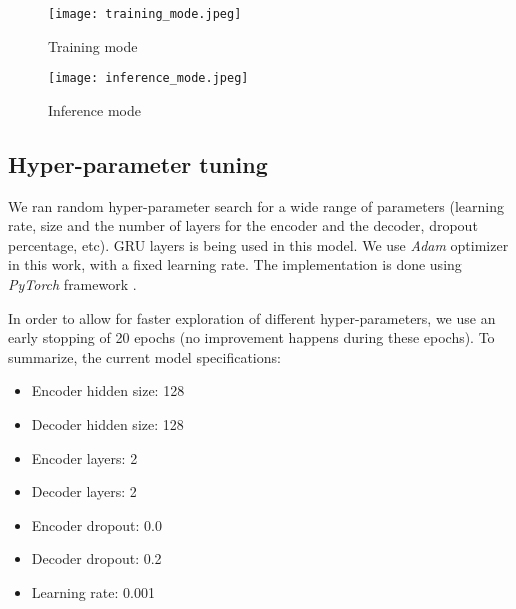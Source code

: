 \documentclass[conference]{IEEEtran}
\begin{document}

\begin{figure*}[htbp!]
    \centering
    \begin{subfigure}{1.0\textwidth}
        \centering
        \texttt{[image: training\_mode.jpeg]}
        \caption{Training mode\label{fig:training_mode}}
    \end{subfigure}
    \begin{subfigure}{1.0\textwidth}
        \centering
        \texttt{[image: inference\_mode.jpeg]}
        \caption{Inference mode\label{fig:inf_mode}}
    \end{subfigure}
    \caption{Schematic diagram of the model we used. During the training time \ref{fig:training_mode}, the input to the model is always the ground truth. During the inference time \ref{fig:inf_mode} however, the input to the decoder (generator) part at each time step is its own predication in the previous time step.}
    \label{fig:model_arch}
\end{figure*}

\subsection{Hyper-parameter tuning} \label{hyperparam}
\par We ran random hyper-parameter search for a wide range of parameters (learning rate, size and the number of layers for the encoder and the decoder, dropout percentage, etc). GRU layers \cite{cho2014learning,chung2014empirical} is being used in this model. We use \textit{Adam} \cite{kingma2014adam} optimizer in this work, with a fixed learning rate. The implementation is done using \textit{PyTorch} framework \cite{paszke2017automatic}.

\par In order to allow for faster exploration of different hyper-parameters, we use an early stopping of 20 epochs (no improvement happens during these epochs). To summarize, the current model specifications:
\begin{itemize}
    \item Encoder hidden size: 128
    \item Decoder hidden size: 128
    \item Encoder layers: 2
    \item Decoder layers: 2
    \item Encoder dropout: 0.0
    \item Decoder dropout: 0.2
    \item Learning rate: 0.001
\end{itemize}
\end{document}
